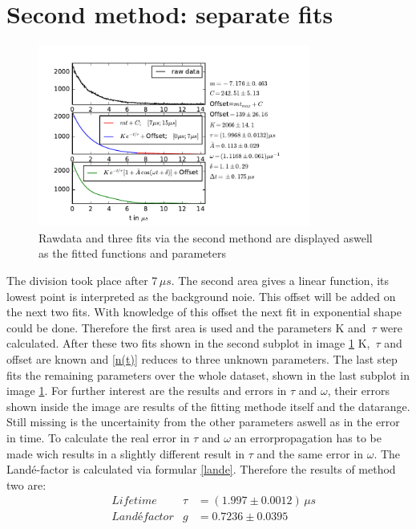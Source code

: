 \documentclass{include/thesisclass3}
\newcommand{\e}[1]{\,\si{#1}}
\begin{document}
\section{Second method: separate fits}
\label{second}
\begin{figure}[H]
	\begin{center}
		\includegraphics[width=0.8\textwidth]{images/plot.pdf}
		\caption{Rawdata and three fits via the second methond are displayed aswell as the fitted functions and parameters}
		\label{method2}
	\end{center}
\end{figure}
The division took place after 7$\e{\mu s}$. The second area gives a linear function, its lowest point is interpreted as the background noie. This offset will be added on the next two fits. With knowledge of this offset the next fit in exponential shape could be done. Therefore the first area is used and the parameters K and $\e{\tau}$ were calculated. After these two fits shown in the second subplot in image \ref{method2} K, $\e{\tau}$ and offset are known and \ref{n(t)} reduces to three unknown parameters. The last step fits the remaining parameters over the whole dataset, shown in the last subplot in image \ref{method2}. For further interest are the results and errors in $\tau$ and $\omega$, their errors shown inside the image are results of the fitting methode itself and the datarange. Still missing is the uncertainity from the other parameters aswell as in the error in time. To calculate the real error in $\tau$ and $\omega$ an errorpropagation has to be made wich results in a slightly different result in $\tau$ and the same error in $\omega$. The Landé-factor is calculated via formular \ref{lande}. Therefore the results of method two are:
\begin{align}
&\e{Lifetime} &\tau &=(1.997\pm 0.0012)\e{\mu s}\\
&\e{Landé factor} &g &=0.7236 \pm 0.0395
\end{align}
\end{document}
